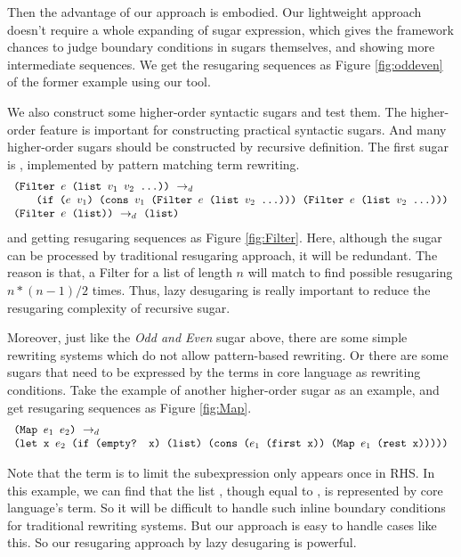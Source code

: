 Then the advantage of our approach is embodied. Our lightweight approach doesn't require a whole expanding of sugar expression, which gives the framework chances to judge boundary conditions in sugars themselves, and showing more intermediate sequences. We get the resugaring sequences as Figure \ref{fig:oddeven} of the former example using our tool.



We also construct some higher-order syntactic sugars and test them. The higher-order feature is important for constructing practical syntactic sugars. And many higher-order sugars should be constructed by recursive definition. The first sugar is , implemented by pattern matching term rewriting.
\[\begin{array}{l}
\drule{\Code{(Filter $e$ (list $v_1$ $v_2$ ...))}}{}\\
\qquad\Code{(if ($e$ $v_1$) (cons $v_1$ (Filter $e$ (list $v_2$ ...)))\ (Filter $e$ (list $v_2$ ...)))}\\
\drule{\Code{(Filter $e$ (list))}}{\Code{(list)}}
\end{array}\]
and getting resugaring sequences as Figure \ref{fig:Filter}.
Here, although the sugar can be processed by traditional resugaring approach, it will be redundant. The reason is that, a Filter for a list of length $n$ will match to find possible resugaring $n*(n-1)/2$ times. Thus, lazy desugaring is really important to reduce the resugaring complexity of recursive sugar.

Moreover, just like the \emph{Odd and Even} sugar above, there are some simple rewriting systems which do not allow pattern-based rewriting. Or there are some sugars that need to be expressed by the terms in core language as rewriting conditions. Take the example of another higher-order sugar  as an example, and get resugaring sequences as Figure \ref{fig:Map}.
\[
\begin{array}{l}
\texttt{(Map $e_1$ $e_2$)} ~\rightarrow_d~\\
\texttt{(let x $e_2$ (if (empty? x) (list) (cons ($e_1$ (first x)) (Map $e_1$ (rest x)))))}
\end{array}
\]



Note that the  term is to limit the subexpression only appears once in RHS. In this example, we can find that the list , though equal to , is represented by core language's term. So it will be difficult to handle such inline boundary conditions for traditional rewriting systems. But our approach is easy to handle cases like this. So our resugaring approach by lazy desugaring is powerful.
